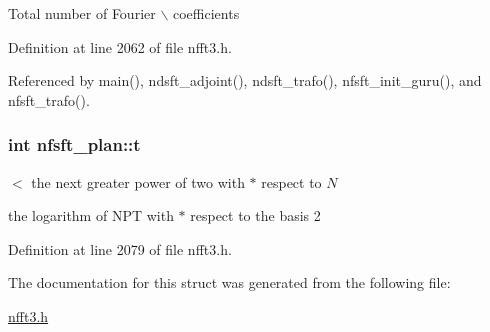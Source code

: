 Total number of Fourier $\backslash$ coefficients 

Definition at line 2062 of file nfft3.h.

Referenced by main(), ndsft\_\-adjoint(), ndsft\_\-trafo(), nfsft\_\-init\_\-guru(), and nfsft\_\-trafo().\hypertarget{structnfsft__plan_59d80818cb9c0dcaccc477954720772c}{
\subsubsection{\setlength{\rightskip}{0pt plus 5cm}int {\bf nfsft\_\-plan::t}}}
\label{structnfsft__plan_59d80818cb9c0dcaccc477954720772c}


$<$ the next greater power of two with $\ast$ respect to $N$ 

the logarithm of NPT with $\ast$ respect to the basis 2 

Definition at line 2079 of file nfft3.h.

The documentation for this struct was generated from the following file:\begin{CompactItemize}
\item 
\hyperlink{nfft3_8h}{nfft3.h}\end{CompactItemize}
